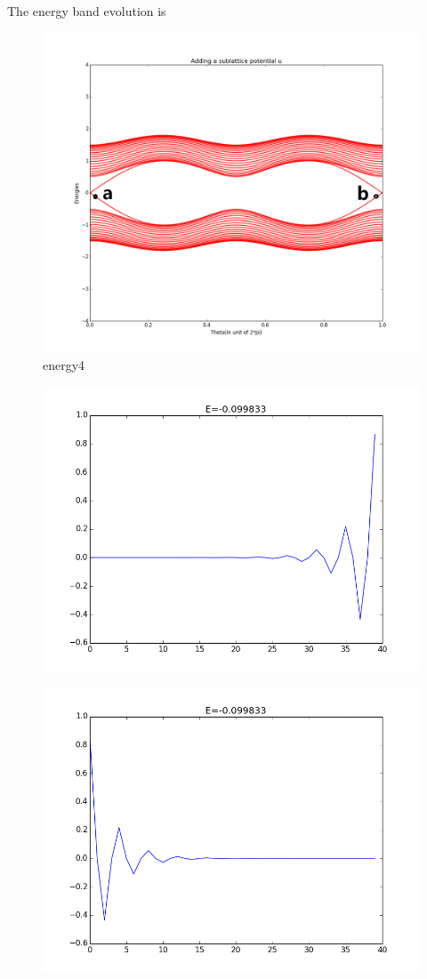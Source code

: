 \documentclass[letterpaper,10pt,english]{sphinxmanual}
\begin{document}
The energy band evolution is
\begin{figure}[htbp]
\centering
\capstart

\includegraphics[width=0.700\linewidth]{figure_4.png}
\caption{energy4}\end{figure}
\begin{figure}[htbp]
\centering

\includegraphics[width=0.500\linewidth]{1a.png}
\end{figure}
\begin{figure}[htbp]
\centering

\includegraphics[width=0.500\linewidth]{2a.png}
\end{figure}
\end{document}

